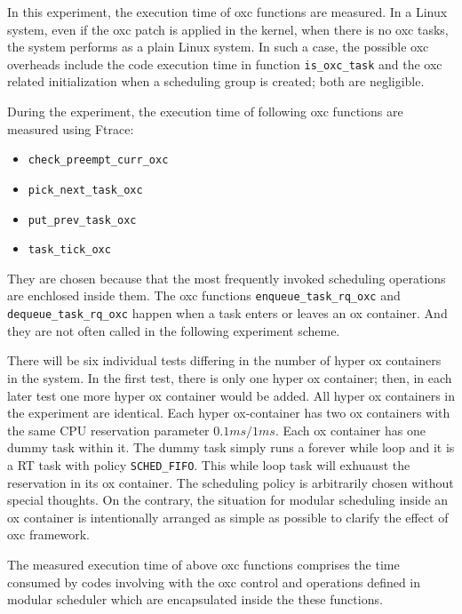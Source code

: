 In this experiment, the execution time of oxc functions are measured.
In a Linux system, even if the oxc patch is applied in the kernel, 
when there is no oxc tasks, the system performs as a plain Linux system. 
In such a case, the possible oxc overheads include the code execution time 
in function \texttt{is\_oxc\_task} and the oxc related initialization when 
a scheduling group is created; both are negligible.

During the experiment, the execution time of following oxc functions are 
measured using Ftrace:
\begin{itemize} 
\item \texttt{check\_preempt\_curr\_oxc}
\item \texttt{pick\_next\_task\_oxc}
\item \texttt{put\_prev\_task\_oxc}
\item \texttt{task\_tick\_oxc}
\end{itemize} 
They are chosen because that the most frequently invoked 
scheduling operations are enchlosed inside them.
The oxc functions 
\texttt{enqueue\_task\_rq\_oxc} and \texttt{dequeue\_task\_rq\_oxc} 
happen when a task enters or leaves an ox container. And they are not 
often called in the following experiment scheme.

There will be six individual tests differing in the number of hyper ox 
containers in the system. In the first test, there is only one hyper 
ox container; then, in each later test one more hyper ox container 
would be added. All hyper ox containers in the experiment are identical.
Each hyper ox-container has two ox containers with the same CPU 
reservation parameter $0.1ms/1ms$. Each ox container has one dummy task 
within it. The dummy task simply runs a forever while loop and it is a 
RT task with policy \texttt{SCHED\_FIFO}. This while loop task will 
exhuaust the reservation in its ox container. The scheduling policy is 
arbitrarily chosen without special thoughts. On the contrary, the 
situation for modular scheduling inside an ox container is intentionally
arranged as simple as possible to clarify the effect of oxc framework.

The measured execution time of above oxc functions comprises the time 
consumed by codes involving with the oxc control and operations defined 
in modular scheduler which are encapsulated inside the these functions.

